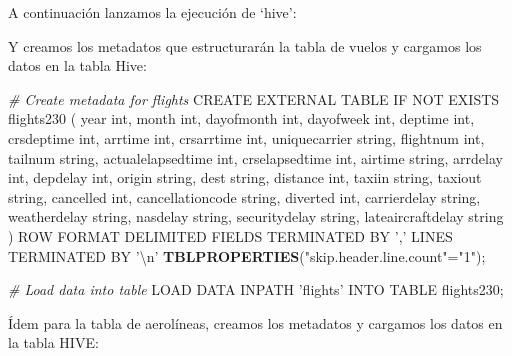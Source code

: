 \documentclass[]{book}
\newenvironment{Shaded}{\begin{snugshade}}{\end{snugshade}}
\newcommand{\CharTok}[1]{\textcolor[rgb]{0.31,0.60,0.02}{#1}}
\newcommand{\CommentTok}[1]{\textcolor[rgb]{0.56,0.35,0.01}{\textit{#1}}}
\newcommand{\KeywordTok}[1]{\textcolor[rgb]{0.13,0.29,0.53}{\textbf{#1}}}
\newcommand{\NormalTok}[1]{#1}
\newcommand{\OperatorTok}[1]{\textcolor[rgb]{0.81,0.36,0.00}{\textbf{#1}}}
\newcommand{\StringTok}[1]{\textcolor[rgb]{0.31,0.60,0.02}{#1}}
\begin{document}
A continuación lanzamos la ejecución de `hive':

\begin{Shaded}
\end{Shaded}

Y creamos los metadatos que estructurarán la tabla de vuelos y cargamos los datos en la tabla Hive:

\begin{Shaded}
\begin{Highlighting}[]
\CommentTok{# Create metadata for flights}
\NormalTok{CREATE EXTERNAL TABLE IF NOT EXISTS flights230}
\NormalTok{(}
\NormalTok{year int,}
\NormalTok{month int,}
\NormalTok{dayofmonth int,}
\NormalTok{dayofweek int,}
\NormalTok{deptime int,}
\NormalTok{crsdeptime int,}
\NormalTok{arrtime int, }
\NormalTok{crsarrtime int,}
\NormalTok{uniquecarrier string,}
\NormalTok{flightnum int,}
\NormalTok{tailnum string, }
\NormalTok{actualelapsedtime int,}
\NormalTok{crselapsedtime int,}
\NormalTok{airtime string,}
\NormalTok{arrdelay int,}
\NormalTok{depdelay int, }
\NormalTok{origin string,}
\NormalTok{dest string,}
\NormalTok{distance int,}
\NormalTok{taxiin string,}
\NormalTok{taxiout string,}
\NormalTok{cancelled int,}
\NormalTok{cancellationcode string,}
\NormalTok{diverted int,}
\NormalTok{carrierdelay string,}
\NormalTok{weatherdelay string,}
\NormalTok{nasdelay string,}
\NormalTok{securitydelay string,}
\NormalTok{lateaircraftdelay string}
\NormalTok{)}
\NormalTok{ROW FORMAT DELIMITED}
\NormalTok{FIELDS TERMINATED BY }\StringTok{','}
\NormalTok{LINES TERMINATED BY }\StringTok{'}\CharTok{\textbackslash{}n}\StringTok{'}
\KeywordTok{TBLPROPERTIES}\NormalTok{(}\StringTok{"skip.header.line.count"}\NormalTok{=}\StringTok{"1"}\NormalTok{);}

\CommentTok{# Load data into table}
\NormalTok{LOAD DATA INPATH }\StringTok{'flights'}\NormalTok{ INTO TABLE flights230;}
\end{Highlighting}
\end{Shaded}

Ídem para la tabla de aerolíneas, creamos los metadatos y cargamos los datos en la tabla HIVE:
\end{document}
